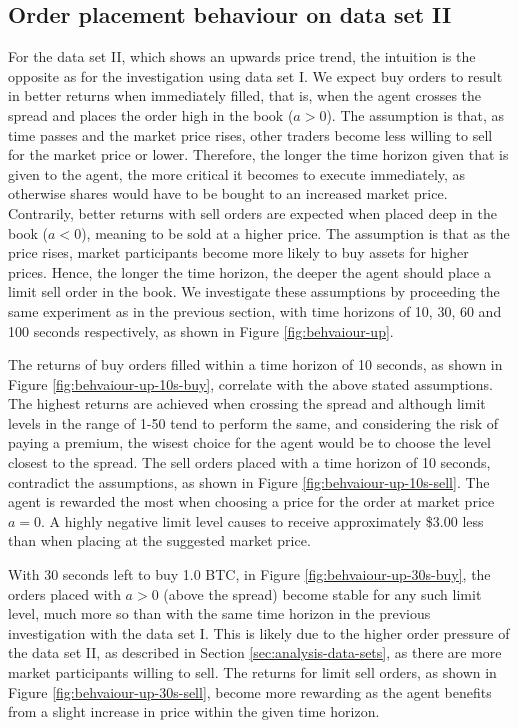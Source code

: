 \subsection{Order placement behaviour on data set II}
For the data set II, which shows an upwards price trend, the intuition is the opposite as for the investigation using data set I.
We expect buy orders to result in better returns when immediately filled, that is, when the agent crosses the spread and places the order high in the book ($a>0$).
The assumption is that, as time passes and the market price rises, other traders become less willing to sell for the market price or lower.
Therefore, the longer the time horizon given that is given to the agent, the more critical it becomes to execute immediately, as otherwise shares would have to be bought to an increased market price.
Contrarily, better returns with sell orders are expected when placed deep in the book ($a<0$), meaning to be sold at a higher price.
The assumption is that as the price rises, market participants become more likely to buy assets for higher prices.
Hence, the longer the time horizon, the deeper the agent should place a limit sell order in the book.
We investigate these assumptions by proceeding the same experiment as in the previous section, with time horizons of 10, 30, 60 and 100 seconds respectively, as shown in Figure \ref{fig:behvaiour-up}.

The returns of buy orders filled within a time horizon of 10 seconds, as shown in Figure \ref{fig:behvaiour-up-10s-buy}, correlate with the above stated assumptions.
The highest returns are achieved when crossing the spread and although limit levels in the range of 1-50 tend to perform the same, and considering the risk of paying a premium, the wisest choice for the agent would be to choose the level closest to the spread.
The sell orders placed with a time horizon of 10 seconds, contradict the assumptions, as shown in Figure \ref{fig:behvaiour-up-10s-sell}.
The agent is rewarded the most when choosing a price for the order at market price $a=0$.
A highly negative limit level causes to receive approximately \$3.00 less than when placing at the suggested market price.

With 30 seconds left to buy 1.0 BTC, in Figure \ref{fig:behvaiour-up-30s-buy}, the orders placed with $a>0$ (above the spread) become stable for any such limit level, much more so than with the same time horizon in the previous investigation with the data set I.
This is likely due to the higher order pressure of the data set II, as described in Section \ref{sec:analysis-data-sets}, as there are more market participants willing to sell.
The returns for limit sell orders, as shown in Figure \ref{fig:behvaiour-up-30s-sell}, become more rewarding as the agent benefits from a slight increase in price within the given time horizon.

